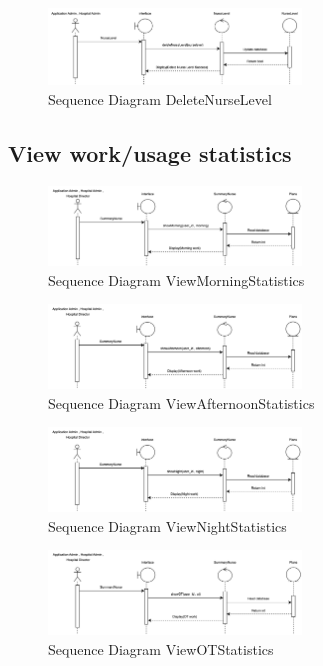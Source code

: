     \begin{figure}[h]
    \centering
    \includegraphics[width=0.6\textwidth]{Sequence 10.4.png}
    \caption{Sequence Diagram DeleteNurseLevel}
    \end{figure}

\subsection{View work/usage statistics}

\begin{figure}[h]
    \centering
    \includegraphics[width=0.6\textwidth]{Sequence 11.1.png}
    \caption{Sequence Diagram ViewMorningStatistics}
    \end{figure}

    \begin{figure}[h]
    \centering
    \includegraphics[width=0.6\textwidth]{Sequence 11.2.png}
    \caption{Sequence Diagram ViewAfternoonStatistics}
    \end{figure}

    \begin{figure}[h]
    \centering
    \includegraphics[width=0.6\textwidth]{Sequence 11.3.png}
    \caption{Sequence Diagram ViewNightStatistics}
    \end{figure}

    \begin{figure}[h]
    \centering
    \includegraphics[width=0.6\textwidth]{Sequence 11.4.png}
    \caption{Sequence Diagram ViewOTStatistics}
    \end{figure}

